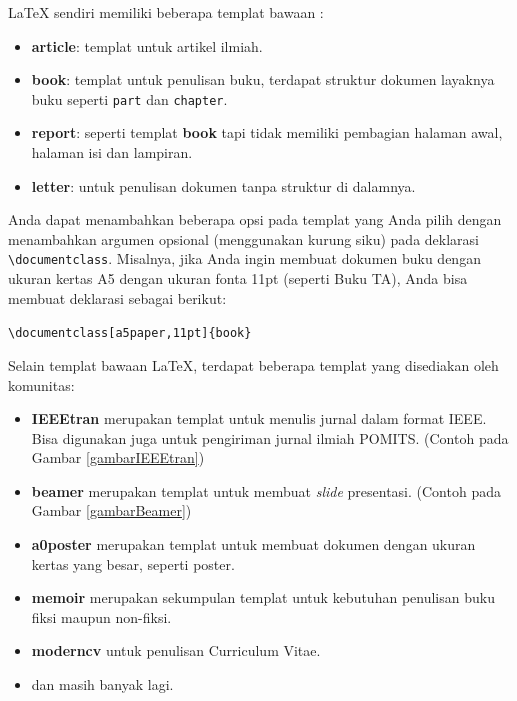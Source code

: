 \documentclass{ta-its}
\begin{document}
        \LaTeX{} sendiri memiliki beberapa templat bawaan :
        \begin{itemize}
        	\item \textbf{article}: templat untuk artikel ilmiah.
        	\item \textbf{book}: templat untuk penulisan buku, terdapat struktur dokumen layaknya buku seperti \texttt{part} dan \texttt{chapter}.
        	\item \textbf{report}: seperti templat \textbf{book} tapi tidak memiliki pembagian halaman awal, halaman isi dan lampiran.
        	\item \textbf{letter}: untuk penulisan dokumen tanpa struktur di dalamnya.
        	
        \end{itemize}
        Anda dapat menambahkan beberapa opsi pada templat yang Anda pilih dengan menambahkan argumen opsional (menggunakan kurung siku) pada deklarasi \texttt{\textbackslash{}documentclass}. Misalnya, jika Anda ingin membuat dokumen buku dengan ukuran kertas A5 dengan ukuran fonta 11pt (seperti Buku TA), Anda bisa membuat deklarasi sebagai berikut:
        
        \texttt{\textbackslash{}documentclass[a5paper,11pt]\{book\}}
        
        Selain templat bawaan \LaTeX, terdapat beberapa templat yang disediakan oleh komunitas:
        
        \begin{itemize}
        	\item \textbf{IEEEtran} merupakan templat untuk menulis jurnal dalam format IEEE. Bisa digunakan juga untuk pengiriman jurnal ilmiah POMITS. (Contoh pada Gambar \ref{gambarIEEEtran})
        	\item \textbf{beamer} merupakan templat untuk membuat \emph{slide} presentasi. (Contoh pada Gambar \ref{gambarBeamer})
        	\item \textbf{a0poster} merupakan templat untuk membuat dokumen dengan ukuran kertas yang besar, seperti poster.
        	\item \textbf{memoir} merupakan sekumpulan templat untuk kebutuhan penulisan buku fiksi maupun non-fiksi.
        	\item \textbf{moderncv} untuk penulisan Curriculum Vitae.
        	\item dan masih banyak lagi.
        \end{itemize}
        
\end{document}
